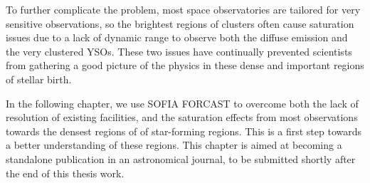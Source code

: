 To further complicate the problem, most space observatories are tailored for very sensitive observations, so the brightest regions of clusters often cause saturation issues due to a lack of dynamic range to observe both the diffuse emission and the very clustered YSOs. These two issues have continually prevented scientists from gathering a good picture of the physics in these dense and important regions of stellar birth.

In the following chapter, we use SOFIA FORCAST to overcome both the lack of resolution of existing facilities, and the saturation effects from most observations towards the densest regions of of star-forming regions. This is a first step towards a better understanding of these regions. This chapter is aimed at becoming a standalone publication in an astronomical journal, to be submitted shortly after the end of this thesis work.


